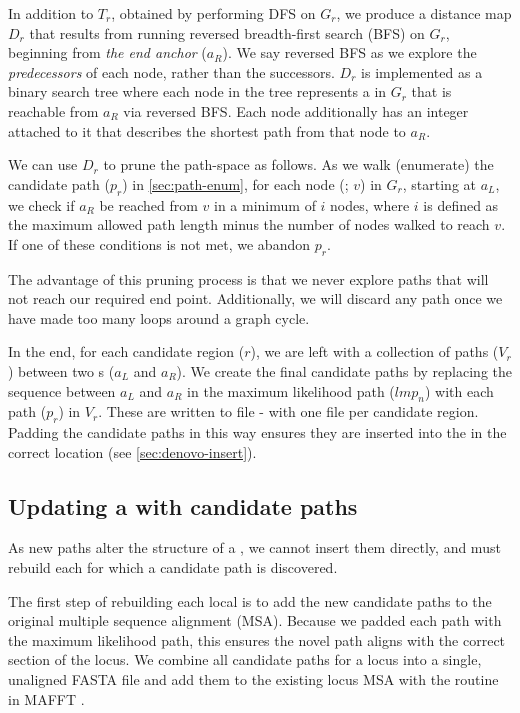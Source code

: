 In addition to $T_r$, obtained by performing DFS on $G_r$, we produce a distance map $D_r$ that results from running reversed breadth-first search (BFS) on $G_r$, beginning from \emph{the end anchor} ($a_R$). We say reversed BFS as we explore the \emph{predecessors} of each node, rather than the successors. $D_r$ is implemented as a binary search tree where each node in the tree represents a \kmer{} in $G_r$ that is reachable from $a_R$ via reversed BFS. Each node additionally has an integer attached to it that describes the shortest path from that node to $a_R$.

We can use $D_r$ to prune the path-space as follows. As we walk (enumerate) the candidate path ($p_r$) in \autoref{sec:path-enum}, for each node (\kmer{}; $v$) in $G_r$, starting at $a_L$, we check if $a_R$ be reached from $v$ in a minimum of $i$ nodes, where $i$ is defined as the maximum allowed path length minus the number of nodes walked to reach $v$. If one of these conditions is not met, we abandon $p_r$. 

The advantage of this pruning process is that we never explore paths that will not reach our required end point. Additionally, we will discard any path once we have made too many loops around a graph cycle.

\noindent
In the end, for each candidate region ($r$), we are left with a collection of paths ($V_r$) between two \kmer{}s ($a_L$ and $a_R$). We create the final candidate paths by replacing the sequence between $a_L$ and $a_R$ in the maximum likelihood path ($lmp_n$) with each path ($p_r$) in $V_r$. These are written to file - with one file per candidate region. Padding the candidate paths in this way ensures they are inserted into the \prg{} in the correct location (see \autoref{sec:denovo-insert}). 

\subsection{Updating a \panrg{} with candidate paths}
\label{sec:denovo-insert}

As new paths alter the structure of a \prg{}, we cannot insert them directly, and must rebuild each \prg{} for which a candidate path is discovered.

The first step of rebuilding each local \prg{} is to add the new candidate paths to the original multiple sequence alignment (MSA). Because we padded each path with the maximum likelihood path, this ensures the novel path aligns with the correct section of the locus. We combine all candidate paths for a locus into a single, unaligned FASTA file and add them to the existing locus MSA with the  routine in MAFFT \cite{katoh2012}. 

